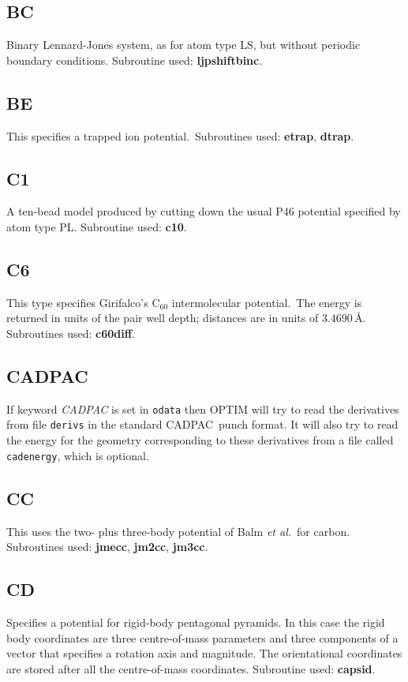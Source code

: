 \documentclass[12pt,a4paper,dvips]{article}
\newcommand{\etal}{{\it et al.}}
\begin{document}
\subsection{BC}Binary Lennard-Jones system, as for atom type LS, but without periodic
boundary conditions. Subroutine used: {\bf ljpshiftbinc}.

\subsection{BE}This specifies a trapped ion potential.\cite{walesl93}\
Subroutines used: {\bf etrap}, {\bf dtrap}.

\subsection{C1}A ten-bead model produced by cutting down the usual P46 potential specified
by atom type PL. Subroutine used: {\bf c10}.

\subsection{C6}This type specifies Girifalco's C$_{60}$ intermolecular potential.\cite{girifalco92}\
The energy is returned in units of the pair well depth; distances are in units of $3.4690\,$\AA.
Subroutines used: {\bf c60diff}.

\subsection{CADPAC}If keyword {\it CADPAC\/} is set in {\tt odata} then
OPTIM will try to read the derivatives from file {\tt derivs} in the
standard CADPAC\cite{CADPAC}\ punch format. 
It will also try to read the energy for the geometry
corresponding to these derivatives from a file called {\tt cadenergy}, which is optional.

\subsection{CC}This uses the two- plus three-body potential of Balm \etal\ for carbon.\cite{balmakm91} 
Subroutines used: {\bf jmecc}, {\bf jm2cc}, {\bf jm3cc}.

\subsection{CD}Specifies a potential for rigid-body pentagonal pyramids. In this case the
rigid body coordinates are three centre-of-mass parameters and three components of a 
vector that specifies a rotation axis and magnitude. The orientational coordinates are stored
after all the centre-of-mass coordinates. Subroutine used: {\bf capsid}.
\end{document}
